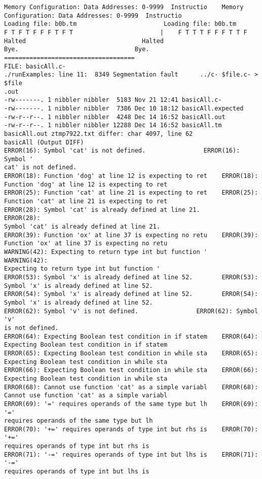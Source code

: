 \documentclass[12pt]{book}
\begin{document}
\begin{lstlisting}
Memory Configuration: Data Addresses: 0-9999  Instructio    Memory 
Configuration: Data Addresses: 0-9999  Instructio
Loading file: b0b.tm                        Loading file: b0b.tm
F T F T F F F T F T                        |    F T T T F F F T T F 
Halted                                Halted
Bye.                                Bye.
====================================
FILE: basicAll.c-
./runExamples: line 11:  8349 Segmentation fault      ../c- $file.c- > $file
.out
-rw-------. 1 nibbler nibbler  5183 Nov 21 12:41 basicAll.c-
-rw-------. 1 nibbler nibbler  7386 Dec 10 18:12 basicAll.expected
-rw-r--r--. 1 nibbler nibbler  4248 Dec 14 16:52 basicAll.out
-rw-r--r--. 1 nibbler nibbler 12288 Dec 14 16:52 basicAll.tm
basicAll.out ztmp7922.txt differ: char 4097, line 62
basicAll (Output DIFF)
ERROR(16): Symbol 'cat' is not defined.                ERROR(16): Symbol '
cat' is not defined.
ERROR(18): Function 'dog' at line 12 is expecting to ret    ERROR(18): 
Function 'dog' at line 12 is expecting to ret
ERROR(25): Function 'cat' at line 21 is expecting to ret    ERROR(25): 
Function 'cat' at line 21 is expecting to ret
ERROR(28): Symbol 'cat' is already defined at line 21.        ERROR(28): 
Symbol 'cat' is already defined at line 21.
ERROR(39): Function 'ox' at line 37 is expecting no retu    ERROR(39): 
Function 'ox' at line 37 is expecting no retu
WARNING(42): Expecting to return type int but function '    WARNING(42): 
Expecting to return type int but function '
ERROR(53): Symbol 'x' is already defined at line 52.        ERROR(53): 
Symbol 'x' is already defined at line 52.
ERROR(54): Symbol 'x' is already defined at line 52.        ERROR(54): 
Symbol 'x' is already defined at line 52.
ERROR(62): Symbol 'v' is not defined.                ERROR(62): Symbol 'v' 
is not defined.
ERROR(64): Expecting Boolean test condition in if statem    ERROR(64): 
Expecting Boolean test condition in if statem
ERROR(65): Expecting Boolean test condition in while sta    ERROR(65): 
Expecting Boolean test condition in while sta
ERROR(66): Expecting Boolean test condition in while sta    ERROR(66): 
Expecting Boolean test condition in while sta
ERROR(68): Cannot use function 'cat' as a simple variabl    ERROR(68): 
Cannot use function 'cat' as a simple variabl
ERROR(69): '=' requires operands of the same type but lh    ERROR(69): '=' 
requires operands of the same type but lh
ERROR(70): '+=' requires operands of type int but rhs is    ERROR(70): '+=' 
requires operands of type int but rhs is
ERROR(71): '-=' requires operands of type int but lhs is    ERROR(71): '-=' 
requires operands of type int but lhs is

\end{lstlisting}
\end{document}
